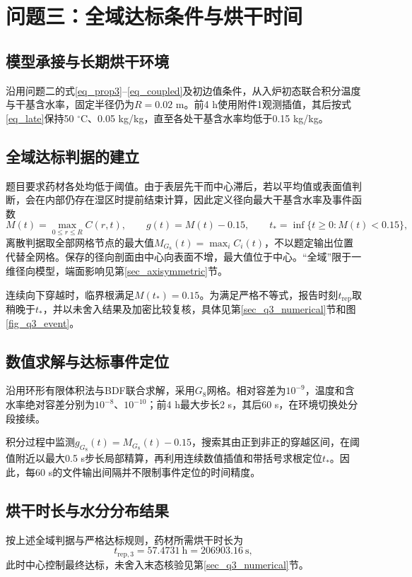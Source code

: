 \section{问题三：全域达标条件与烘干时间}\label{sec_q3}
\subsection{模型承接与长期烘干环境}
沿用问题二的式\eqref{eq_prop3}--\eqref{eq_coupled}及初边值条件，从入炉初态联合积分温度与干基含水率，固定半径仍为$R=0.02$ m。前4 h使用附件1观测插值，其后按式\eqref{eq_late}保持50 $^\circ$C、0.05 kg/kg，直至各处干基含水率均低于0.15 kg/kg。

\subsection{全域达标判据的建立}
题目要求药材各处均低于阈值。由于表层先干而中心滞后，若以平均值或表面值判断，会在内部仍存在湿区时提前结束计算，因此定义径向最大干基含水率及事件函数
\begin{equation}\label{eq_event}
M(t)=\max_{0\le r\le R}C(r,t),\qquad
g(t)=M(t)-0.15,\qquad
t_* =\inf\{t\ge0:M(t)<0.15\},
\end{equation}
离散判据取全部网格节点的最大值$M_{G_8}(t)=\max_iC_i(t)$，不以题定输出位置代替全网格。保存的径向剖面由中心向表面不增，最大值位于中心。“全域”限于一维径向模型，端面影响见第\ref{sec_axisymmetric}节。

连续向下穿越时，临界根满足$M(t_*)=0.15$。为满足严格不等式，报告时刻$t_{\mathrm{rep}}$取稍晚于$t_*$，并以未舍入结果及加密比较复核，具体见第\ref{sec_q3_numerical}节和图\ref{fig_q3_event}。

\subsection{数值求解与达标事件定位}
沿用环形有限体积法与BDF联合求解，采用$G_8$网格。相对容差为$10^{-9}$，温度和含水率绝对容差分别为$10^{-8}$、$10^{-10}$；前4 h最大步长2 s，其后60 s，在环境切换处分段接续。

积分过程中监测$g_{G_8}(t)=M_{G_8}(t)-0.15$，搜索其由正到非正的穿越区间，在阈值附近以最大0.5 s步长局部精算，再利用连续数值插值和带括号求根定位$t_*$。因此，每60 s的文件输出间隔并不限制事件定位的时间精度。

\subsection{烘干时长与水分分布结果}
按上述全域判据与严格达标规则，药材所需烘干时长为
\begin{equation}\label{eq_q3_answer}
t_{\mathrm{rep},3}=57.4731\ \mathrm h=206903.16\ \mathrm s,
\end{equation}
此时中心控制最终达标，未舍入末态核验见第\ref{sec_q3_numerical}节。

